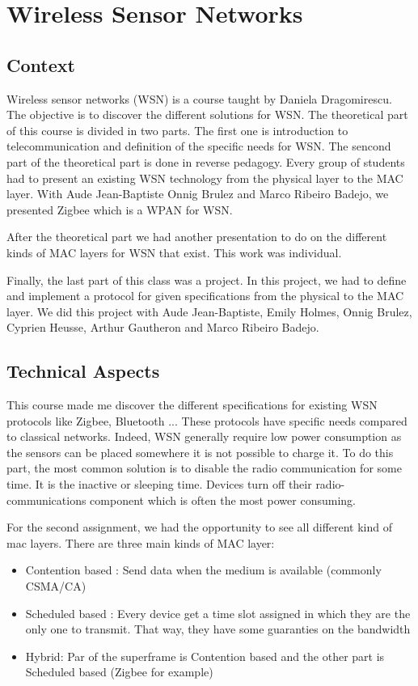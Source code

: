 \section{Wireless Sensor Networks}

\subsection{Context}

Wireless sensor networks (WSN) is a course taught by Daniela Dragomirescu. The objective is to discover the different solutions for WSN. The theoretical part of this course is divided in two parts. The first one is introduction to telecommunication and definition of the specific needs for WSN. The sencond part of the theoretical part is done in reverse pedagogy. Every group of students had to present an existing WSN technology from the physical layer to the MAC layer. With Aude Jean-Baptiste Onnig Brulez and Marco Ribeiro Badejo, we presented Zigbee which is a WPAN for WSN.
\smallskip

After the theoretical part we had another presentation to do on the different kinds of MAC layers for WSN that exist. This work was individual.
\smallskip

Finally, the last part of this class was a project. In this project, we had to define and implement a protocol for given specifications from the physical to the MAC layer. We did this project with Aude Jean-Baptiste, Emily Holmes, Onnig Brulez, Cyprien Heusse, Arthur Gautheron and Marco Ribeiro Badejo.

\subsection{Technical Aspects}

This course made me discover the different specifications for existing WSN protocols like Zigbee, Bluetooth ... These protocols have specific needs compared to classical networks. Indeed, WSN generally require low power consumption as the sensors can be placed somewhere it is not possible to charge it. To do this part, the most common solution is to disable the radio communication for some time. It is the inactive or sleeping time. Devices turn off their radio-communications component which is often the most power consuming.
\smallskip

For the second assignment, we had the opportunity to see all different kind of mac layers. There are three main kinds of MAC layer:
\begin{itemize}
    \item Contention based : Send data when the medium is available (commonly CSMA/CA)
    \item Scheduled based : Every device get a time slot assigned in which they are the only one to transmit. That way, they have some guaranties on the bandwidth
    \item Hybrid: Par of the superframe is Contention based and the other part is Scheduled based (Zigbee for example)
\end{itemize}

